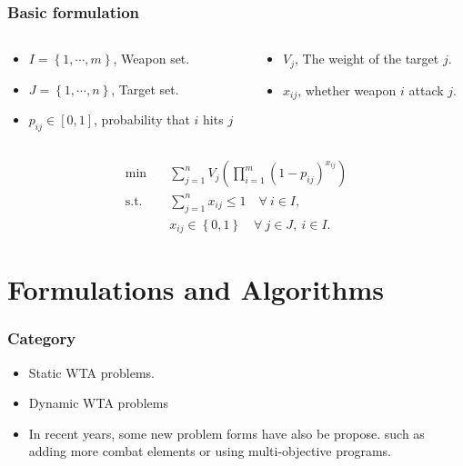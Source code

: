 \documentclass[CJK,10pt]{beamer}
\begin{document}
\begin{frame}
    \frametitle{Basic formulation}
    \begin{columns}
        \begin{column}{.50\linewidth}
            \footnotesize
            \begin{itemize}
                \item $I = \left\{1,\cdots,m\right\} $, Weapon set.
                \item $J = \left\{1,\cdots,n\right\} $, Target set.
                \item $p_{ij}\in [0,1]$, probability that $i$ hits $j$
            \end{itemize}
        \end{column}
    \hspace{-1cm}
        \begin{column}{.50\linewidth}
            \footnotesize
            \begin{itemize}
                \item $V_j$, The weight of the target $j$.
                \item $x_{ij}$, whether weapon $i$ attack $j$.
            \end{itemize}
        \end{column}
    \end{columns}
    
    \begin{align}
        \min\quad & \sum_{j=1}^n V_j \left( \prod_{i=1}^m (1 -  p_{ij})^{x_{ij}} \right) \\ 
        \mathrm{s. t.}\quad &\sum_{j=1}^n x_{ij} \leq 1\quad \forall ~i \in I,\\
        & x_{ij} \in \left\{ 0,1 \right\} \quad \forall~ j\in J , ~ i \in I.
    \end{align}
\end{frame}



\section{Formulations and Algorithms}

\begin{frame}
    \frametitle{Category}
    \begin{itemize}
        \item Static WTA problems.
        \item Dynamic WTA problems
        \item In recent years, some new problem forms have also be propose. such as adding more combat elements or using multi-objective programs.
    \end{itemize}
\end{frame}
\end{document}
